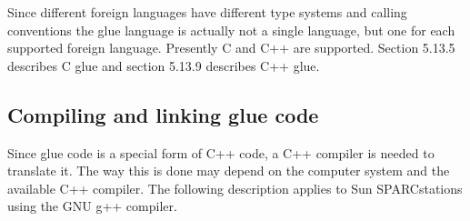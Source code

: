\documentclass[letterpaper,10pt,english]{sphinxmanual}
\begin{document}
Since different foreign languages have different type systems and calling conventions the glue language
is actually not a single language, but one for each supported foreign language. Presently C
and C++ are supported. Section 5.13.5 describes C glue and section 5.13.9 describes C++ glue.


\subsection{Compiling and linking glue code}
\label{vmref:index-65}\label{vmref:compiling-and-linking-glue-code}
Since glue code is a special form of C++ code, a C++ compiler is needed to translate it. The way
this is done may depend on the computer system and the available C++ compiler. The following
description applies to Sun SPARCstations using the GNU g++ compiler.
\end{document}
